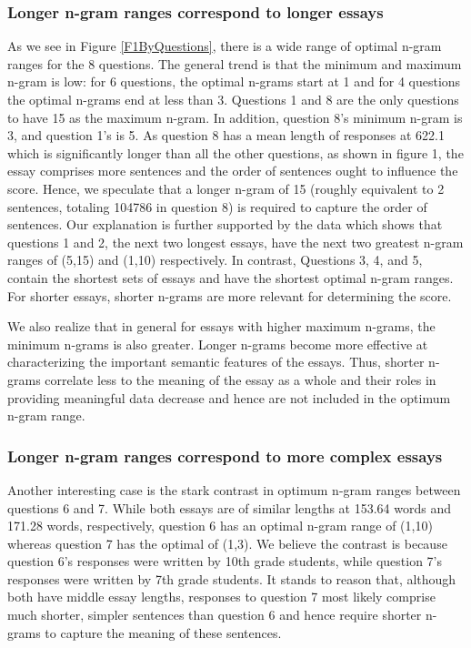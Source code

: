 \documentclass[10pt,letterpaper]{article}
\begin{document}
\subsubsection{Longer n-gram ranges correspond to longer essays}
As we see in Figure \ref{F1ByQuestions}, there is a wide range of optimal n-gram ranges for the 8 questions. The general trend is that the minimum and maximum n-gram is low: for 6 questions, the optimal n-grams start at 1 and for 4 questions the optimal n-grams end at less than 3. Questions 1 and 8 are the only questions to have 15 as the maximum n-gram. In addition, question 8's minimum n-gram is 3, and question 1's is 5. As question 8 has a mean length of responses at 622.1 which is significantly longer than all the other questions, as shown in figure 1, the essay comprises more sentences and the order of sentences ought to influence the score. Hence, we speculate that a longer n-gram of 15 (roughly equivalent to 2 sentences, totaling 104786 in question 8) is required to capture the order of sentences. Our explanation is further supported by the data which shows that questions 1 and 2, the next two longest essays, have the next two greatest n-gram ranges of (5,15) and (1,10) respectively. In contrast, Questions 3, 4, and 5, contain the shortest sets of essays and have the shortest optimal n-gram ranges. For shorter essays, shorter n-grams are more relevant for determining the score.

We also realize that in general for essays with higher maximum n-grams, the minimum n-grams is also greater. Longer n-grams become more effective at characterizing the important semantic features of the essays. Thus, shorter n-grams correlate less to the meaning of the essay as a whole and their roles in providing meaningful data decrease and hence are not included in the optimum n-gram range. 

\subsubsection{Longer n-gram ranges correspond to more complex essays}
Another interesting case is the stark contrast in optimum n-gram ranges between questions 6 and 7. While both essays are of similar lengths at 153.64 words and 171.28 words, respectively, question 6 has an optimal n-gram range of (1,10) whereas question 7 has the optimal of (1,3). We believe the contrast is because question 6's responses were written by 10th grade students, while question 7's responses were written by 7th grade students. It stands to reason that, although both have middle essay lengths, responses to question 7 most likely comprise much shorter, simpler sentences than question 6 and hence require shorter n-grams to capture the meaning of these sentences.
\end{document}
